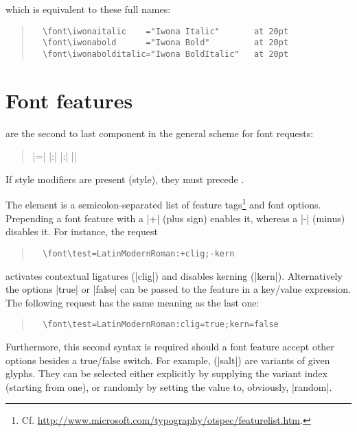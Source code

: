 \noindent
which is equivalent to these full names:

\begin{quote}
  \begin{verbatim}
  \font\iwonaitalic    ="Iwona Italic"       at 20pt
  \font\iwonabold      ="Iwona Bold"         at 20pt
  \font\iwonabolditalic="Iwona BoldItalic"   at 20pt
  \end{verbatim}
\end{quote}

\section {Font features}

 are the second to last component in the
general scheme for font requests:

\begin{quote}
      |\font\foo={|%
      |:|%
      |:|%
      |}|%
\end{quote}

\noindent
If style modifiers are present (\XETEX style), they must precede
.

The element  is a semicolon-separated list of feature
tags\footnote{%
  Cf. \url{http://www.microsoft.com/typography/otspec/featurelist.htm}.
}
and font options.
%
Prepending a font feature with a |+| (plus sign) enables it, whereas
a |-| (minus) disables it. For instance, the request

\begin{quote}
  \begin{verbatim}
  \font\test=LatinModernRoman:+clig;-kern
  \end{verbatim}
\end{quote}

\noindent activates contextual ligatures (|clig|) and disables
kerning (|kern|).
%
Alternatively the options |true| or |false| can be passed to
the feature in a key/value expression.
%
The following request has the same meaning as the last one:

\begin{quote}
  \begin{verbatim}
  \font\test=LatinModernRoman:clig=true;kern=false
  \end{verbatim}
\end{quote}

\noindent
Furthermore, this second syntax is required should a font feature
accept other options besides a true/false switch.
%
For example,  (|salt|) are variants of
given glyphs.
%
They can be selected either explicitly by supplying the variant
index (starting from one), or randomly by setting the value to,
obviously, |random|.

